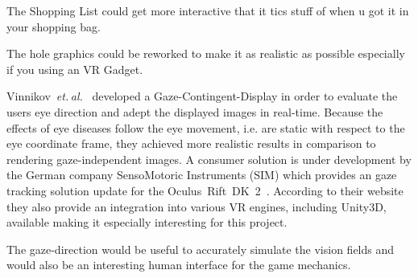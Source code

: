 \documentclass{sig-alternate-05-2015}
\newcommand{\etal}{\textit{et. al.}}
\begin{document}
The Shopping List could get more interactive that it tics stuff of when u got it in your shopping bag.

The hole graphics could be reworked to make it as realistic as possible especially if you using an VR Gadget.

Vinnikov \etal \cite{gazedisplays} developed a Gaze-Contingent-Display in order to evaluate the users eye direction and adept the displayed images in real-time.
Because the effects of eye diseases follow the eye movement, i.e. are static with respect to the eye coordinate frame, they achieved more realistic results in comparison to rendering gaze-independent images.
A consumer solution is under development by the German company SensoMotoric Instruments (SIM) which provides an gaze tracking solution update for the Oculus Rift DK 2 \cite{smi-oculus, arstechoculus}.
According to their website they also provide an integration into various VR engines, including Unity3D, available making it especially interesting for this project.

The gaze-direction would be useful to accurately simulate the vision fields and would also be an interesting human interface for the game mechanics.
%
\printbibliography

\balancecolumns
\end{document}
